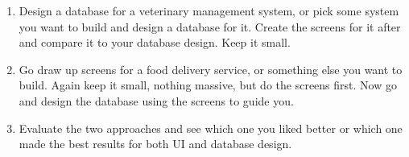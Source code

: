 \begin{enumerate}
\item Design a database for a veterinary management system, or pick some system you want to build and
    design a database for it.  Create the screens for it after and compare it to your database design.
    Keep it small.
\item Go draw up screens for a food delivery service, or something else you want to build.  Again keep
    it small, nothing massive, but do the screens first.  Now go and design the database using the
    screens to guide you.
\item Evaluate the two approaches and see which one you liked better or which one made the best results
    for both UI and database design.
\end{enumerate}
